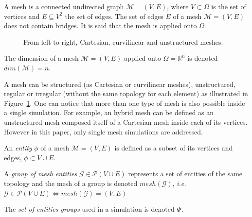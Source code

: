 \begin{mydef}
A mesh is a connected undirected graph $\mathcal{M}=(V,E)$, where $V\subset \Omega$ is the set of vertices and $E\subseteq V^2$ the set of edges. The set of edges $E$ of a mesh $\mathcal{M}=(V,E)$ does not contain bridges. It is said that the mesh is applied onto $\Omega$.
\end{mydef}
\begin{figure}[!h]\begin{center}
  \caption{From left to right, Cartesian, curvilinear and unstructured meshes.}
  \label{fig:mesh1}
\end{center}\end{figure}
\begin{mydef}
The dimension of a mesh $\mathcal{M}=(V,E)$ applied onto $\Omega=\mathbb{R}^n$ is denoted $dim(\mathcal{M})=n$.
\end{mydef}
A mesh can be structured (as Cartesian or curvilinear meshes), unstructured, regular or irregular (without the same topology for each element) as illustrated in Figure~\ref{fig:mesh1}. One can notice that more than one type of mesh is also possible inside a single simulation. For example, an hybrid mesh can be defined as an unstructured mesh composed itself of a Cartesian mesh inside each of its vertices.
However in this paper, only single mesh simulations are addressed.

\medskip

\begin{mydefs}
\item An \textit{entity} $\phi$ of a mesh $\mathcal{M}=(V,E)$ is defined as a subset of its vertices and edges, $\phi\subset V\cup E$.
\item A \textit{group of mesh entities} $\mathcal{G} \in \mathcal{P}(V\cup E)$ represents a set of entities of the same topology and the mesh of a group is denoted $mesh(\mathcal{G})$, \textit{i.e.} $\mathcal{G} \in \mathcal{P}(V\cup E) \Leftrightarrow mesh(\mathcal{G})=(V,E)$
\item The \textit{set of entities groups} used in a simulation is denoted $\Phi$.
\end{mydefs}

